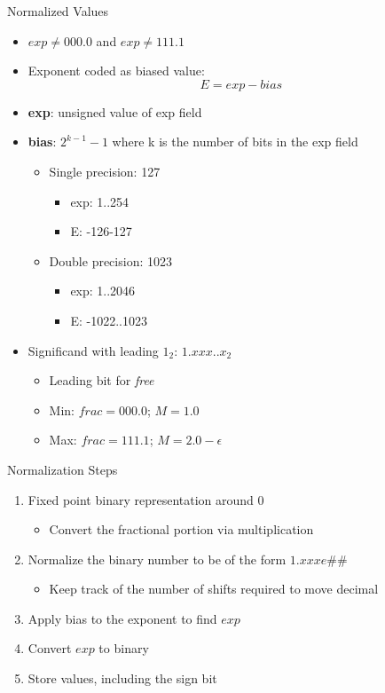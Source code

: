 \begin{frame}{Normalized Values}
  \begin{itemize}
  \item $exp \ne 000.0$ and $exp \ne 111.1$
  \item Exponent coded as biased value:
    \begin{equation}
      E = exp - bias
    \end{equation}
  \item \textbf{exp}: unsigned value of exp field
  \item \textbf{bias}: $2^{k-1} -1 $ where k is the number of bits in the exp
    field
      \begin{itemize}
      \item Single precision: 127
        \begin{itemize}
        \item exp: 1..254
        \item E: -126-127
        \end{itemize}
      \item Double precision: 1023
        \begin{itemize}
        \item exp: 1..2046
        \item E: -1022..1023
        \end{itemize}
      \end{itemize}
    \item Significand with leading $1_2$: $1.xxx..x_{2}$
      \begin{itemize}
      \item Leading bit for \emph{free}
      \item Min: $frac = 000.0$; $M = 1.0$
      \item Max: $frac = 111.1$; $M = 2.0 - \epsilon$
      \end{itemize}
  \end{itemize}
\end{frame}
\begin{frame}{Normalization Steps}
  \begin{enumerate}
  \item Fixed point binary representation around 0
    \begin{itemize}
    \item Convert the fractional portion via multiplication
    \end{itemize}
  \item Normalize the binary number to be of the form $1.xxxe\#\#$
    \begin{itemize}
    \item Keep track of the number of shifts required to move decimal
    \end{itemize}
  \item Apply bias to the exponent to find $exp$
  \item Convert $exp$ to binary
  \item Store values, including the sign bit
  \end{enumerate}
\end{frame}
